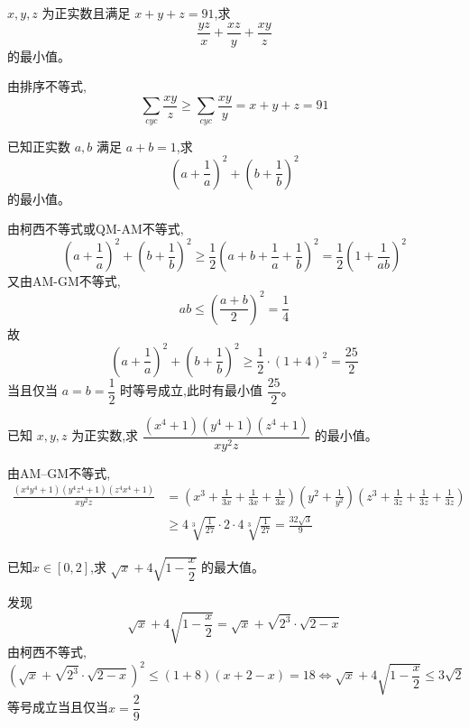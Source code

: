 \begin{questions}
    \question $x,y,z$ 为正实数且满足 $x+y+z=91$,求
    \[
    \frac{yz}{x} + \frac{xz}{y} + \frac{xy}{z}
    \]
    的最小值。
    \begin{solution}
        由排序不等式,
        \[
        \sum_{cyc} \frac{xy}{z} \ge \sum_{cyc} \frac{xy}{y} = x+y+z=91
        \]
    \end{solution}

    \question 已知正实数 $a,b$ 满足 $a + b = 1$,求 
    \[
    \left(a + \dfrac{1}{a}\right)^{2} + \left(b + \dfrac{1}{b}\right)^{2}
    \]
    的最小值。
    \begin{solution}
        由柯西不等式或QM-AM不等式, 
        \[
        \left(a+\frac{1}{a}\right)^2+\left(b+\frac{1}{b}\right)^2
        \ge
        \frac12\left(a+b+\frac{1}{a}+\frac{1}{b}\right)^2=\frac12\left(1+\frac{1}{ab}\right)^2
        \]
        又由AM-GM不等式,
        \[
        ab\le\left(\frac{a+b}{2}\right)^2=\frac14
        \]
        故
        \[
        \left(a+\frac{1}{a}\right)^2+\left(b+\frac{1}{b}\right)^2
        \ge
        \frac12\cdot (1+4)^2=\frac{25}{2}
        \]
        当且仅当 $a=b=\dfrac12$ 时等号成立,此时有最小值 $\dfrac{25}{2}$。
    \end{solution}

    \question 已知 $x,y,z$ 为正实数,求 $\dfrac{(x^4+1)(y^4+1)(z^4+1)}{xy^2z}$ 的最小值。
    \begin{solution}
        由AM–GM不等式,
        \begin{align*}
        \frac{(x^4y^4+1)(y^4z^4+1)(z^4x^4+1)}{xy^2z}
        &=\left(x^3+\frac{1}{3x}+\frac{1}{3x}+\frac{1}{3x}\right)\left(y^2+\frac{1}{y^2}\right)\left(z^3+\frac{1}{3z}+\frac{1}{3z}+\frac{1}{3z}\right)\\
        &\ge 4\sqrt[3]{\frac{1}{27}}\cdot 2 \cdot 4\sqrt[3]{\frac{1}{27}} = \frac{32\sqrt{3}}{9}
        \end{align*}
    \end{solution}

    \question 已知$x \in [0,2]$,求 $\sqrt{x}+4\sqrt{1-\dfrac{x}{2}}$ 的最大值。
    \begin{solution}
        发现
        \[
        \sqrt{x}+4\sqrt{1-\frac{x}{2}}=\sqrt{x}+\sqrt{2^3}\cdot \sqrt{2-x}
        \]
        由柯西不等式,
        \[
        (\sqrt{x}+\sqrt{2^3}\cdot \sqrt{2-x})^2\le(1+8)(x+2-x)=18 \Leftrightarrow \sqrt{x}+4\sqrt{1-\frac{x}{2}} \le 3\sqrt{2}
        \]
        等号成立当且仅当$x=\dfrac{2}{9}$
    \end{solution}


\end{questions}
